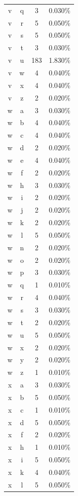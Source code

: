 \begin{longtable}{cccc}
    v & q & 3 & 0.030\% \\
    v & r & 5 & 0.050\% \\
    v & s & 5 & 0.050\% \\
    v & t & 3 & 0.030\% \\
    v & u & 183 & 1.830\% \\
    v & w & 4 & 0.040\% \\
    v & x & 4 & 0.040\% \\
    v & z & 2 & 0.020\% \\
    w & a & 3 & 0.030\% \\
    w & b & 4 & 0.040\% \\
    w & c & 4 & 0.040\% \\
    w & d & 2 & 0.020\% \\
    w & e & 4 & 0.040\% \\
    w & f & 2 & 0.020\% \\
    w & h & 3 & 0.030\% \\
    w & i & 2 & 0.020\% \\
    w & j & 2 & 0.020\% \\
    w & k & 2 & 0.020\% \\
    w & l & 5 & 0.050\% \\
    w & n & 2 & 0.020\% \\
    w & o & 2 & 0.020\% \\
    w & p & 3 & 0.030\% \\
    w & q & 1 & 0.010\% \\
    w & r & 4 & 0.040\% \\
    w & s & 3 & 0.030\% \\
    w & t & 2 & 0.020\% \\
    w & u & 5 & 0.050\% \\
    w & x & 2 & 0.020\% \\
    w & y & 2 & 0.020\% \\
    w & z & 1 & 0.010\% \\
    x & a & 3 & 0.030\% \\
    x & b & 5 & 0.050\% \\
    x & c & 1 & 0.010\% \\
    x & d & 5 & 0.050\% \\
    x & f & 2 & 0.020\% \\
    x & h & 1 & 0.010\% \\
    x & i & 5 & 0.050\% \\
    x & k & 4 & 0.040\% \\
    x & l & 5 & 0.050\% \\

\end{longtable}
